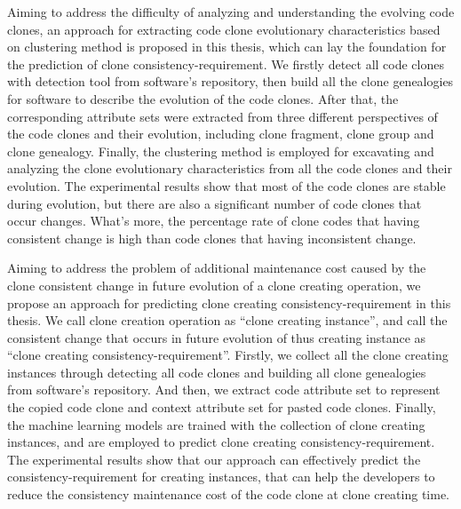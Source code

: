 {Aiming to address the difficulty of analyzing and understanding the evolving code clones, an approach for extracting code clone evolutionary characteristics based on clustering method is proposed in this thesis, which can lay the foundation for the prediction of clone consistency-requirement.
We firstly detect all code clones with detection tool from software's repository, then build all the clone genealogies for software to describe the evolution of the code clones.
After that, the corresponding attribute sets were extracted from three different perspectives of the code clones and their evolution, including clone fragment, clone group and clone genealogy. 
Finally, the clustering method is employed for excavating and analyzing the clone evolutionary characteristics from all the code clones and their evolution. 
The experimental results show that most of the code clones are stable during evolution, but there are also a significant number of code clones that occur changes. 
What's more, the percentage rate of clone codes that having consistent change is high than code clones that having inconsistent change.

Aiming to address the problem of additional maintenance cost caused by the clone consistent change in future evolution of a clone creating operation, we propose an approach for predicting clone creating consistency-requirement in this thesis.
We call clone creation operation as ``clone creating instance'', and call the consistent change that occurs in future evolution of thus creating instance as ``clone creating consistency-requirement''.
Firstly, we collect all the clone creating instances through detecting all code clones and building all clone genealogies from software's repository.
And then, we extract code attribute set  to represent the copied code clone and context attribute set for pasted code clones.
Finally, the machine learning models are trained with the collection of clone creating instances, and are employed to predict clone creating consistency-requirement. 
The experimental results show that our approach can effectively predict the consistency-requirement for creating instances, that can help the developers to reduce the consistency maintenance cost of the code clone at clone creating time.

}
